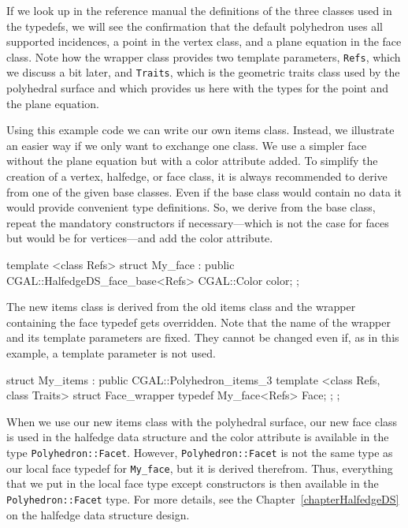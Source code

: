 If we look up in the reference manual the definitions of the three
classes used in the typedefs, we will see the confirmation that the
default polyhedron uses all supported incidences, a point in the
vertex class, and a plane equation in the face class. Note how the
wrapper class provides two template parameters, \texttt{Refs}, which
we discuss a bit later, and \texttt{Traits}, which is the geometric
traits class used by the polyhedral surface and which provides us here
with the types for the point and the plane equation.

Using this example code we can write our own items class. Instead, we
illustrate an easier way if we only want to exchange one class. We use
a simpler face without the plane equation but with a color attribute
added. To simplify the creation of a vertex, halfedge, or face class,
it is always recommended to derive from one of the given base classes.
Even if the base class would contain no data it would provide
convenient type definitions. So, we derive from the base class, repeat
the mandatory constructors if necessary---which is not the case for
faces but would be for vertices---and add the color attribute.

\begin{ccExampleCode}
template <class Refs>
struct My_face : public CGAL::HalfedgeDS_face_base<Refs> {
    CGAL::Color color;
};
\end{ccExampleCode}

The new items class is derived from the old items class and the
wrapper containing the face typedef gets overridden. Note that the
name of the wrapper and its template parameters are fixed. They cannot
be changed even if, as in this example, a template parameter is not
used.

\begin{ccExampleCode}
struct My_items : public CGAL::Polyhedron_items_3 {
    template <class Refs, class Traits>
    struct Face_wrapper {
        typedef My_face<Refs> Face;
    };
};
\end{ccExampleCode}

When we use our new items class with the polyhedral surface, our new
face class is used in the halfedge data structure and the color
attribute is available in the type \texttt{Polyhedron::Facet}. However,
\texttt{Polyhedron::Facet} is not the same type as our local face 
typedef for \texttt{My\_face}, but it is derived therefrom. Thus,
everything that we put in the local face type except constructors is
then available in the \texttt{Polyhedron::Facet} type. For more
details, see the Chapter~\ref{chapterHalfedgeDS} on the halfedge data
structure design.

